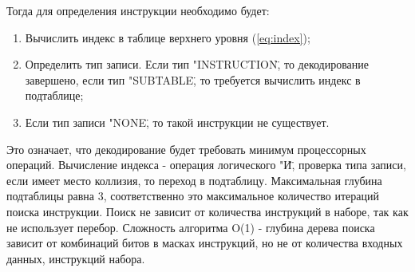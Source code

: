 Тогда для определения инструкции необходимо будет:

\begin{enumerate}
	\item Вычислить индекс в таблице верхнего уровня (\ref{eq:index});
	\item Определить тип записи. Если тип "INSTRUCTION\", то декодирование завершено, если тип "SUBTABLE\", то требуется вычислить индекс в подтаблице;
	\item Если тип записи "NONE\", то такой инструкции не существует. 
\end{enumerate}

Это означает, что декодирование будет требовать минимум процессорных операций. Вычисление индекса - операция логического "И\", проверка типа записи, если имеет место коллизия, то переход в подтаблицу. Максимальная глубина подтаблицы равна 3, соответственно это максимальное количество итераций поиска инструкции. Поиск не зависит от количества инструкций в наборе, так как не использует перебор. Сложность алгоритма O(1) - глубина дерева поиска зависит от комбинаций битов в масках инструкций, но не от количества входных данных, инструкций набора.



